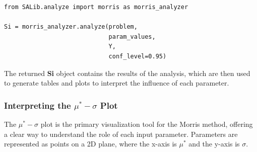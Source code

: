 \begin{enumerate}
    \begin{verbatim}
from SALib.analyze import morris as morris_analyzer

Si = morris_analyzer.analyze(problem, 
                             param_values, 
                             Y, 
                             conf_level=0.95)
    \end{verbatim}
    
    The returned \textbf{Si} object contains the results of the analysis, which are then used to generate tables and plots to interpret the influence of each parameter.
    
\end{enumerate}

\subsubsection{Interpreting the $\mu^*-\sigma$ Plot}
The $\mu^*-\sigma$ plot is the primary visualization tool for the Morris method, offering a clear way to understand the role of each input parameter. Parameters are represented as points on a 2D plane, where the x-axis is $\mu^*$ and the y-axis is $\sigma$.
